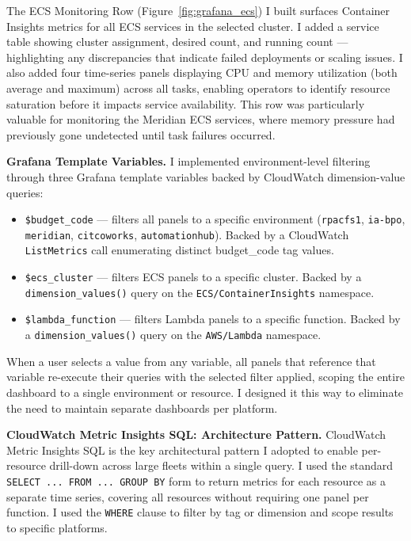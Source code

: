The ECS Monitoring Row (Figure~\ref{fig:grafana_ecs}) I built surfaces
Container Insights metrics for all ECS services in the selected cluster.
I added a service table showing cluster assignment, desired count, and running
count --- highlighting any discrepancies that indicate failed deployments
or scaling issues. I also added four time-series panels displaying CPU and memory
utilization (both average and maximum) across all tasks, enabling
operators to identify resource saturation before it impacts service
availability. This row was particularly valuable for monitoring the
Meridian ECS services, where memory pressure had previously gone
undetected until task failures occurred.

\textbf{Grafana Template Variables.}
I implemented environment-level filtering through three Grafana
template variables backed by CloudWatch dimension-value queries:

\begin{itemize}
    \item \texttt{\$budget\_code} --- filters all panels to a specific
          environment (\texttt{rpacfs1}, \texttt{ia-bpo}, \texttt{meridian},
          \texttt{citcoworks}, \texttt{automationhub}). Backed by a
          CloudWatch \texttt{ListMetrics} call enumerating distinct
          budget\_code tag values.

    \item \texttt{\$ecs\_cluster} --- filters ECS panels to a specific
          cluster. Backed by a \texttt{dimension\_values()} query on
          the \texttt{ECS/ContainerInsights} namespace.

    \item \texttt{\$lambda\_function} --- filters Lambda panels to a
          specific function. Backed by a \texttt{dimension\_values()}
          query on the \texttt{AWS/Lambda} namespace.
\end{itemize}

When a user selects a value from any variable, all panels that reference
that variable re-execute their queries with the selected filter applied,
scoping the entire dashboard to a single environment or
resource. I designed it this way to eliminate the need to maintain separate dashboards per
platform.

\textbf{CloudWatch Metric Insights SQL: Architecture Pattern.}
CloudWatch Metric Insights SQL is the key architectural pattern I adopted to
enable per-resource drill-down across large fleets within a single query.
I used the standard \texttt{SELECT ... FROM ... GROUP BY} form to return
metrics for each resource as a separate time series, covering all resources
without requiring one panel per function. I used the \texttt{WHERE} clause to
filter by tag or dimension and scope results to specific platforms.

